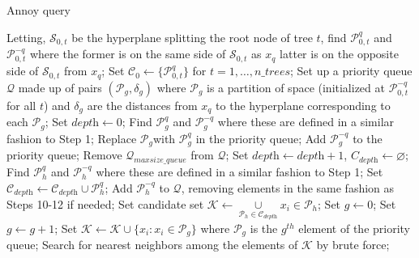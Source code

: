 \documentclass[11pt,a4paper,]{article}
\begin{document}
\begin{algorithm}[!b]
  \caption{Annoy query}
  \label{alg:annoyquery}
  \begin{algorithmic}[1]
    \STATE Letting, $\mathcal{S}_{0,t}$ be the hyperplane splitting the root node of tree $t$, find $\mathcal{P}^q_{0,t}$ and $\mathcal{P}^{-q}_{0,t}$ where the former is on the same side of $\mathcal{S}_{0,t}$ as $x_q$ latter is on the opposite side of $\mathcal{S}_{0,t}$ from $x_q$;
    \STATE Set $\mathcal{C}_0\leftarrow\{\mathcal{P}^q_{0,t}\}$ for $t=1,\dots,\textit{n\_trees}$;
    \STATE Set up a priority queue $\mathcal{Q}$ made up of pairs $(\mathcal{P}_g,\delta_g)$ where $\mathcal{P}_g$ is a partition of space (initialized at $\mathcal{P}^{-q}_{0,t}$ for all $t$) and $\delta_g$ are the distances from $x_q$ to the hyperplane corresponding to each $\mathcal{P}_g$;
    \STATE Set $\textit{depth}\leftarrow 0$;
    \STATE Find $\mathcal{P}^q_g$ and $\mathcal{P}^{-q}_g$ where these are defined in a similar fashion to Step 1;
    \STATE Replace $\mathcal{P}_g$with $\mathcal{P}^q_g$ in the priority queue;
    \STATE Add $\mathcal{P}^{-q}_g$ to the priority queue;
    \STATE Remove $\mathcal{Q}_{maxsize\_queue}$ from $\mathcal{Q}$;
    \ENDIF
    \ENDFOR
    \STATE Set $\textit{depth}\leftarrow \textit{depth}+1$, $C_{\textit{depth}}\leftarrow\varnothing$;
    \STATE Find $\mathcal{P}^q_h$ and $\mathcal{P}^{-q}_h$ where these are defined in a similar fashion to Step 1;
    \STATE Set $\mathcal{C}_{\textit{depth}}\leftarrow\mathcal{C}_{\textit{depth}}\cup\mathcal{P}^q_h$;
    \STATE Add $\mathcal{P}_h^{-q}$ to $\mathcal{Q}$, removing elements in the same fashion as Steps 10-12 if needed;
    \ENDFOR
    \ENDWHILE
    \STATE Set candidate set $\mathcal{K}\leftarrow\underset{\mathcal{P}_h\in\mathcal{C}_{\textit{depth}}}{\cup}x_i\in\mathcal{P}_h$;
    \STATE Set $g\leftarrow 0$;
    \STATE Set $g\leftarrow g+1$;
    \STATE Set $\mathcal{K}\leftarrow\mathcal{K}\cup\{x_i:x_i\in\mathcal{P}_g\}$ where $\mathcal{P}_g$ is the $g^{th}$ element of the priority queue;
    \ENDWHILE
    \STATE Search for nearest neighbors among the elements of $\mathcal{K}$ by brute force;
  \end{algorithmic}
\end{algorithm}
\end{document}
